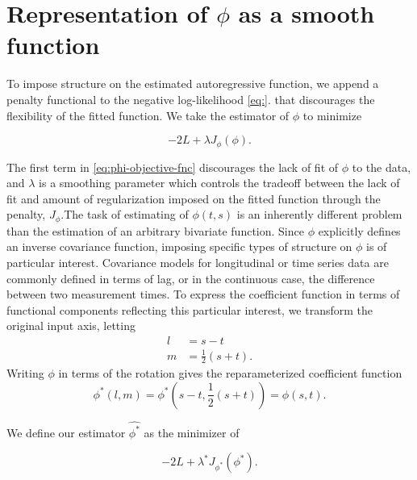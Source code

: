 \documentclass[12pt]{article}
\theoremstyle{definition}
\begin{document}
\section{Representation of $\phi$ as a smooth function}

To impose structure on the estimated autoregressive function, we append a penalty functional to the negative log-likelihood \ref{eq:}. that discourages the flexibility of the fitted function. We take the estimator of $\phi$ to minimize

\begin{equation} 
 -2 L + \lambda J_{\phi}\left(\phi\right)  \label{eq:phi-objective-fnc}.
\end{equation}

The first term in \ref{eq:phi-objective-fnc} discourages the lack of fit of $\phi$ to the data, and $\lambda$ is a smoothing parameter which controls the tradeoff between the lack of fit and amount of regularization imposed on the fitted function through the penalty, $J_\phi$.The task of estimating of $\phi\left(t,s\right)$ is an inherently different problem than the estimation of an arbitrary bivariate function. Since $\phi$ explicitly defines an inverse covariance function, imposing specific types of structure on $\phi$ is of particular interest. Covariance models for longitudinal or time series data are commonly defined in terms of lag, or in the continuous case, the difference between two measurement times.  To express the coefficient function in terms of functional components reflecting this particular interest, we transform the original input axis, letting  
\begin{align*}
l &= s-t \\
m &= \frac{1}{2}\left(s+t\right).
\end{align*}
\noindent
Writing $\phi$ in terms of the rotation gives the reparameterized coefficient function 
\begin{equation}
\phi^*\left(l,m\right) = \phi^*\left(s-t, \frac{1}{2}\left(s+t\right)\right) = \phi\left(s,t\right).
\end{equation}

We define our estimator $\hat{\phi^*}$ as the minimizer of

\begin{equation} 
-2 L + \lambda^* J_{\phi^*}\left(\phi^*\right) \label{eq:phi-star-objective-fnc}.
\end{equation}
\end{document}
